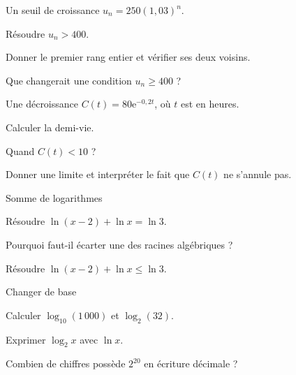 \begingroup\renewcommand{\otBesoinPlace}[1]{}\begin{minipage}{\linewidth}
\begin{exercice}[2]{Un seuil de croissance}
$u_n=250(1{,}03)^n$.
\begin{questions}
\item Résoudre $u_n>400$.
\item Donner le premier rang entier et vérifier ses deux voisins.
\item Que changerait une condition $u_n\geq400$ ?
\end{questions}
\end{exercice}
\begin{exercice}[2]{Une décroissance}
$C(t)=80\mathrm e^{-0{,}2t}$, où $t$ est en heures.
\begin{questions}
\item Calculer la demi-vie.
\item Quand $C(t)<10$ ?
\item Donner une limite et interpréter le fait que $C(t)$ ne s’annule pas.
\end{questions}
\end{exercice}
\begin{exercice}[2]{Somme de logarithmes}

\begin{questions}
\item Résoudre $\ln(x-2)+\ln x=\ln3$.
\item Pourquoi faut-il écarter une des racines algébriques ?
\item Résoudre $\ln(x-2)+\ln x\leq\ln3$.
\end{questions}
\end{exercice}
\begin{exercice}[2]{Changer de base}

\begin{questions}
\item Calculer $\log_{10}(1\,000)$ et $\log_2(32)$.
\item Exprimer $\log_2 x$ avec $\ln x$.
\item Combien de chiffres possède $2^{20}$ en écriture décimale ?
\end{questions}
\end{exercice}
\end{minipage}\endgroup
\clearpage
{}
